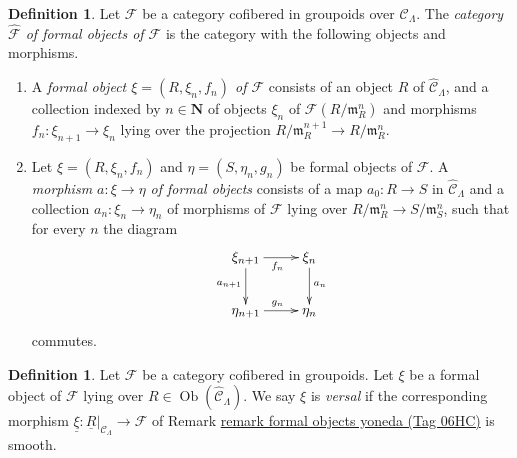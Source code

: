 \documentclass{amsart}
\theoremstyle{plain}
\theoremstyle{definition}
\newtheorem{definition}[subsection]{Definition}
\theoremstyle{remark}
\numberwithin{equation}{subsection}
\def\Ob{\mathop{\mathrm{Ob}}\nolimits}
\begin{document}
\begin{definition}
\label{definition-formal-objects}
Let $\mathcal{F}$ be a category cofibered in groupoids over
$\mathcal{C}_\Lambda$. The {\it category $\widehat{\mathcal{F}}$ of formal
objects of  $\mathcal{F}$} is the category with the following objects and
morphisms.
\begin{enumerate}
\item A {\it formal object $\xi = (R, \xi_n, f_n)$ of $\mathcal{F}$}
consists of an object $R$ of $\widehat{\mathcal{C}}_\Lambda$, and a collection
indexed by $n \in \mathbf{N}$ of objects $\xi_n$ of
$\mathcal{F}(R/\mathfrak m_R^n)$ and morphisms
$f_n : \xi_{n + 1} \to \xi_n$ lying over the projection
$R/\mathfrak m_R^{n + 1} \to R/\mathfrak m_R^n$.
\item Let $\xi = (R, \xi_n, f_n)$ and $\eta = (S, \eta_n, g_n)$ be
formal objects of $\mathcal{F}$.  A {\it morphism $a : \xi \to \eta$ of
formal objects} consists of a map $a_0 : R \to S$ in
$\widehat{\mathcal{C}}_\Lambda$ and a collection $a_n : \xi_n \to \eta_n$
of morphisms of $\mathcal{F}$ lying over
$R/\mathfrak m_R^n \to S/\mathfrak m_S^n$,
such that for every $n$ the diagram
$$
\xymatrix{
\xi_{n + 1} \ar[r]_{f_n} \ar[d]_{a_{n + 1}} & \xi_n \ar[d]^{a_n} \\
\eta_{n + 1} \ar[r]^{g_n} & \eta_n
}
$$
commutes.
\end{enumerate}
\end{definition}

\begin{definition}
\label{definition-versal}
Let $\mathcal{F}$ be a category cofibered in groupoids.  Let $\xi$ be a formal
object of $\mathcal{F}$ lying over $R \in \Ob(\widehat{\mathcal{C}}_\Lambda)$.
We say $\xi$ is {\it versal} if the corresponding morphism
$\underline{\xi}: \underline{R}|_{\mathcal{C}_\Lambda} \to \mathcal{F}$
of Remark \href{https://stacks.math.columbia.edu/tag/06HC}{remark formal objects yoneda (Tag 06HC)} is smooth.
\end{definition}
\end{document}
